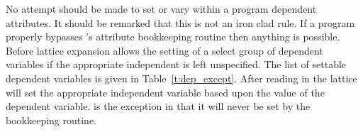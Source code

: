 No attempt should be made to set or vary within a program dependent
attributes. It should be remarked that this is not an iron clad rule.
If a program properly bypasses \bmad's attribute bookkeeping routine
then anything is possible. Before lattice expansion \bmad allows the
setting of a select group of dependent variables if the appropriate
independent is left unspecified.  The list of settable dependent
variables is given in Table~\ref{t:dep_except}.  After reading in the
lattice \bmad will set the appropriate independent variable based
upon the value of the dependent variable.  is the exception in 
that it will never be set by the bookkeeping routine.
\begin{table}[h]
\caption {Dependent variables that can be set in a primary lattice file.}
\label{t:dep_except}
\end{table}

